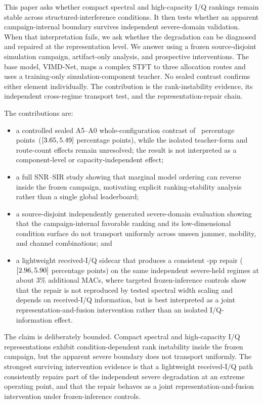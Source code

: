\documentclass[letterpaper,journal]{IEEEtran}
\newcommand{\method}{VIMD-Net}
\newcommand{\pp}{percentage points}
\begin{document}
This paper asks whether compact spectral and high-capacity I/Q rankings remain
stable across structured-interference conditions. It then tests whether an
apparent campaign-internal boundary survives independent severe-domain
validation. When that interpretation fails, we ask whether the degradation can
be diagnosed and repaired at the representation level. We answer using a
frozen source-disjoint simulation campaign, artifact-only analysis, and
prospective interventions. The base model, \method, maps a complex STFT to
three allocation routes and uses a training-only simulation-component teacher.
No sealed contrast confirms either element individually. The contribution is
the rank-instability evidence, its independent cross-regime transport test,
and the representation-repair chain.

The contributions are:
\begin{itemize}
  \item a controlled sealed A5--A0 whole-configuration contrast of
  \MethodEffectDiff\ \pp\
  ($[3.65,5.49]$ \pp), while the isolated
  teacher-form and route-count effects remain unresolved; the result is not
  interpreted as a component-level or capacity-independent effect;
  \item a full SNR--SIR study showing that marginal model ordering can reverse
  inside the frozen campaign, motivating explicit ranking-stability analysis
  rather than a single global leaderboard;
  \item a source-disjoint independently generated severe-domain evaluation
  showing that the campaign-internal favorable ranking and its low-dimensional
  condition surface do not transport uniformly across unseen jammer, mobility,
  and channel combinations; and
  \item a lightweight received-I/Q sidecar that produces a consistent
  \SevereRepairDiff-pp repair ($[2.96,5.90]$ \pp)
  on the same independent severe-held regimes at about 3\% additional MACs,
  where targeted frozen-inference controls show that the repair is not
  reproduced by tested spectral width scaling and depends on received-I/Q
  information, but is best interpreted as a joint representation-and-fusion
  intervention rather than an isolated I/Q-information effect.
\end{itemize}

The claim is deliberately bounded. Compact spectral and high-capacity I/Q
representations exhibit condition-dependent rank instability inside the frozen
campaign, but the apparent severe boundary does not transport uniformly. The
strongest surviving intervention evidence is that a lightweight received-I/Q
path consistently repairs part of the independent severe degradation at an
extreme operating point, and that the repair behaves as a joint
representation-and-fusion intervention under frozen-inference controls.
\end{document}
